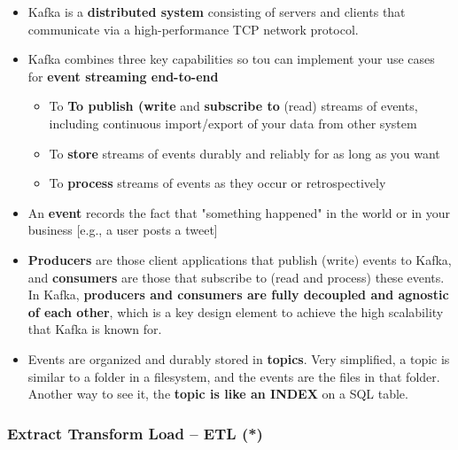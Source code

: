 \begin{itemize}
	\item Kafka is a \textbf{distributed system} consisting of servers and clients that communicate via a high-performance TCP network protocol.
	\item Kafka combines three key capabilities so tou can implement your use cases for \textbf{event streaming end-to-end}
	\begin{itemize}
		\item To \textbf{To publish (write} and \textbf{subscribe to} (read) streams of events, including continuous import/export of your data from other system
		\item To \textbf{store} streams of events durably and reliably for as long as you want
		\item To \textbf{process} streams of events as they occur or retrospectively
	\end{itemize}
	\item An \textbf{event} records the fact that "something happened" in the world or in your business [e.g., a user posts a tweet]
	\item \textbf{Producers} are those client applications that publish (write) events to Kafka, and \textbf{consumers} are those that subscribe to (read and process) these events. In Kafka, \textbf{producers and consumers are fully decoupled and agnostic of each other}, which is a key design element to achieve the high scalability that Kafka is known for.
	\item Events are organized and durably stored in \textbf{topics}. Very simplified, a topic is similar to a folder in a filesystem, and the events are the files in that folder. Another way to see it, the \textbf{topic is like an INDEX} on a SQL table.
\end{itemize}

\subsubsection{Extract Transform Load – ETL (*)}

